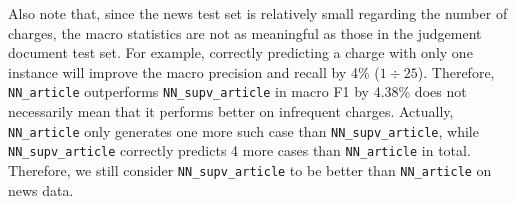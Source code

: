 Also note that, since the news test set is relatively small regarding the number of charges, the macro statistics are not as meaningful as those in the judgement document test set. For example, correctly predicting a charge with only one instance will improve the macro precision and recall by 4\% (${1}\div{25}$). Therefore, \texttt{NN\_article} outperforms \texttt{NN\_supv\_article} in macro F1 by 4.38\% does not necessarily mean that it performs better on infrequent charges. 
Actually, %
\texttt{NN\_article} only generates one more such case than \texttt{NN\_supv\_article}, while \texttt{NN\_supv\_article} correctly predicts 4 more cases than \texttt{NN\_article} in total. Therefore, we still consider \texttt{NN\_supv\_article} to be better than \texttt{NN\_article} on news data.



